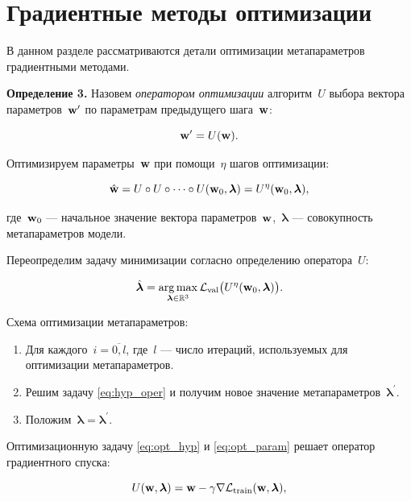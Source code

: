 \documentclass[12pt, twoside]{article}
\begin{document}
\section{Градиентные методы оптимизации}

В данном разделе рассматриваются детали оптимизации метапараметров градиентными методами.

\textbf{Определение 3.} Назовем \emph{оператором оптимизации} алгоритм~$U$ выбора вектора параметров~$\mathbf{w}^\prime$ по параметрам предыдущего шага~$\mathbf{w}$:

\begin{equation*}
    \mathbf{w}^\prime = U(\mathbf{w}).
\end{equation*}

Оптимизируем параметры~$\mathbf{w}$ при помощи~$\eta$ шагов оптимизации:

\begin{equation} \label{eq:oper_superp}
    \hat{\bw} = U \circ U \circ \dots \circ U(\bw_0, \boldsymbol{\lambda}) = U^\eta(\bw_0, \boldsymbol{\lambda}),
\end{equation}

\noindent
где~$\mathbf{w}_0$ --- начальное значение вектора параметров~$\mathbf{w}$,~$\boldsymbol{\lambda}$ --- совокупность метапараметров модели.

Переопределим задачу минимизации согласно определению оператора~$U$:

\begin{equation} \label{eq:hyp_oper}
    \hat{\boldsymbol{\lambda}} = \argmax\limits_{\boldsymbol{\lambda} \in \bbR^3} \cL_\text{val}\bigl(U^\eta(\bw_0, \boldsymbol{\lambda})\bigr).
\end{equation}

Схема оптимизации метапараметров:

\begin{enumerate}
    \item Для каждого~$i = \overline{0, l}$, где~$l$ --- число итераций, используемых для оптимизации метапараметров.
    \item Решим задачу \eqref{eq:hyp_oper} и получим новое значение метапараметров~$\boldsymbol{\lambda}^\prime$.
    \item Положим~$\boldsymbol{\lambda} = \boldsymbol{\lambda}^\prime$.
\end{enumerate}

Оптимизационную задачу \eqref{eq:opt_hyp} и \eqref{eq:opt_param} решает оператор градиентного спуска:

\begin{equation} \label{eq:operator}
    U(\bw, \boldsymbol{\lambda}) = \bw - \gamma\nabla\cL_\text{train}(\bw, \boldsymbol{\lambda}),
\end{equation}
\end{document}
